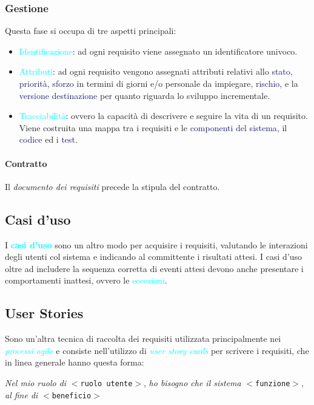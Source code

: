 \subsubsection{Gestione}

Questa fase si occupa di tre aspetti principali:
\begin{itemize}
    \item \textcolor{cyan}{Identificazione}: ad ogni requisito viene assegnato un identificatore univoco.
    \item \textcolor{cyan}{Attributi}: ad ogni requisito vengono assegnati attributi relativi allo \textcolor{MidnightBlue}{stato},
        \textcolor{MidnightBlue}{priorità}, \textcolor{MidnightBlue}{sforzo} in termini di giorni e/o personale da impiegare, \textcolor{MidnightBlue}{rischio},
        e la \textcolor{MidnightBlue}{versione destinazione} per quanto riguarda lo sviluppo incrementale. 
    \item \textcolor{cyan}{Tracciabilità}: ovvero la capacità di descrivere e seguire la vita di un requisito. Viene costruita una mappa tra i requisiti
        e le \textcolor{MidnightBlue}{componenti del sistema}, il \textcolor{MidnightBlue}{codice} ed i \textcolor{MidnightBlue}{test}.
\end{itemize}

\paragraph{Contratto} Il \emph{documento dei requisiti} precede la stipula del contratto.

\subsection{Casi d'uso}

I \textbf{\textcolor{cyan}{casi d'uso}} sono un altro modo per acquisire i requisiti, valutando le interazioni degli utenti col sistema
e indicando al committente i risultati attesi. I casi d'uso oltre ad includere la sequenza corretta di eventi attesi devono anche presentare i comportamenti inattesi,
ovvero le \textcolor{cyan}{eccezioni}.

\subsection{User Stories}

Sono un'altra tecnica di raccolta dei requisiti utilizzata principalmente nei \emph{\textcolor{cyan}{processi agile}} e consiste
nell'utilizzo di \emph{\textcolor{cyan}{user story cards}} per scrivere i requisiti, che in linea generale hanno questa forma:
\begin{center}
    \emph{Nel mio ruolo di} $<$\verb|ruolo utente|$>$, \emph{ho bisogno che il sistema} $<$\verb|funzione|$>$, \emph{al fine di} $<$\verb|beneficio|$>$
\end{center}

